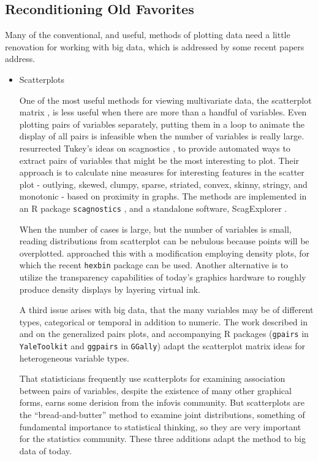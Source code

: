 \documentclass[11pt]{article}
\begin{document}
\subsection{Reconditioning Old Favorites}

Many of the conventional, and useful, methods of plotting data need a little renovation for working with big data, which is addressed by some recent papers address.

\begin{itemize}
\item Scatterplots

One of the most useful methods for viewing multivariate data, the scatterplot matrix \citep{scatmat}, is less useful when there are more than a handful of variables. Even plotting pairs of variables separately, putting them in a loop to animate the display of all pairs is infeasible when the number of variables is really large.  \citet{wilkinson2005graph} resurrected Tukey's ideas on scagnostics \citep{TukeyTukey1985}, to provide automated ways to extract pairs of variables that might be the most interesting to plot. Their approach is to calculate nine measures for interesting features in the scatter plot - outlying, skewed, clumpy, sparse, striated, convex, skinny, stringy, and monotonic - based on proximity in graphs. The methods are implemented in an R package {\tt scagnostics} \citep{wilkinson2014package}, and a standalone software, ScagExplorer \citep{dang2014scagexplorer}.

When the number of cases is large, but the number of variables is small, reading distributions from scatterplot can be nebulous because points will be overplotted. \citet{carr-scatmat} approached this with a modification employing density plots, for which the recent {\tt hexbin} \citep{carr2010hexbin} package can be used. Another alternative is to utilize the transparency capabilities of today's graphics hardware to roughly produce density displays by layering virtual ink.

A third issue arises with big data, that the many variables may be of different types, categorical or temporal in addition to numeric. The work described in \citet{emerson2013generalized} and \citet{friendly2014comment} on the generalized pairs plots, and accompanying R packages ({\tt gpairs} in {\tt YaleToolkit} and {\tt ggpairs} in {\tt GGally}) adapt the scatterplot matrix ideas for heterogeneous variable types.

That statisticians frequently use scatterplots for examining association between pairs of variables, despite the existence of many other graphical forms, earns some derision from the infovis community. But scatterplots are the ``bread-and-butter'' method to examine joint distributions, something of fundamental importance to statistical thinking, so they are very important for the statistics community. These three additions adapt the method to big data of today.


\end{itemize}
\end{document}

